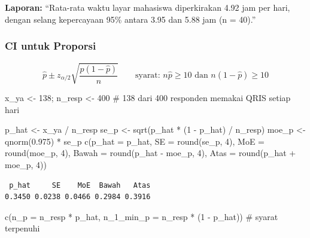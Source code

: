\documentclass[
  indonesian,
  letterpaper,
]{book}
\newenvironment{Shaded}{\begin{snugshade}}{\end{snugshade}}
\newcommand{\AttributeTok}[1]{\textcolor[rgb]{0.40,0.45,0.13}{#1}}
\newcommand{\CommentTok}[1]{\textcolor[rgb]{0.37,0.37,0.37}{#1}}
\newcommand{\DecValTok}[1]{\textcolor[rgb]{0.68,0.00,0.00}{#1}}
\newcommand{\FloatTok}[1]{\textcolor[rgb]{0.68,0.00,0.00}{#1}}
\newcommand{\FunctionTok}[1]{\textcolor[rgb]{0.28,0.35,0.67}{#1}}
\newcommand{\NormalTok}[1]{\textcolor[rgb]{0.00,0.23,0.31}{#1}}
\newcommand{\OtherTok}[1]{\textcolor[rgb]{0.00,0.23,0.31}{#1}}
\newcommand{\SpecialCharTok}[1]{\textcolor[rgb]{0.37,0.37,0.37}{#1}}
\begin{document}
\textbf{Laporan:} ``Rata-rata waktu layar mahasiswa diperkirakan 4.92
jam per hari, dengan selang kepercayaan 95\% antara 3.95 dan 5.88 jam (n
= 40).''

\subsubsection{CI untuk Proporsi}\label{ci-untuk-proporsi}

\[\hat{p} \pm z_{\alpha/2}\sqrt{\frac{\hat{p}(1 - \hat{p})}{n}} \qquad \text{syarat: } n\hat{p} \geq 10 \text{ dan } n(1 - \hat{p}) \geq 10\]

\begin{Shaded}
\begin{Highlighting}[]
\NormalTok{x\_ya }\OtherTok{\textless{}{-}} \DecValTok{138}\NormalTok{; n\_resp }\OtherTok{\textless{}{-}} \DecValTok{400} \CommentTok{\# 138 dari 400 responden memakai QRIS setiap hari}

\NormalTok{p\_hat }\OtherTok{\textless{}{-}}\NormalTok{ x\_ya }\SpecialCharTok{/}\NormalTok{ n\_resp}
\NormalTok{se\_p }\OtherTok{\textless{}{-}} \FunctionTok{sqrt}\NormalTok{(p\_hat }\SpecialCharTok{*}\NormalTok{ (}\DecValTok{1} \SpecialCharTok{{-}}\NormalTok{ p\_hat) }\SpecialCharTok{/}\NormalTok{ n\_resp)}
\NormalTok{moe\_p }\OtherTok{\textless{}{-}} \FunctionTok{qnorm}\NormalTok{(}\FloatTok{0.975}\NormalTok{) }\SpecialCharTok{*}\NormalTok{ se\_p}
\FunctionTok{c}\NormalTok{(}\AttributeTok{p\_hat =}\NormalTok{ p\_hat, }\AttributeTok{SE =} \FunctionTok{round}\NormalTok{(se\_p, }\DecValTok{4}\NormalTok{), }\AttributeTok{MoE =} \FunctionTok{round}\NormalTok{(moe\_p, }\DecValTok{4}\NormalTok{),}
  \AttributeTok{Bawah =} \FunctionTok{round}\NormalTok{(p\_hat }\SpecialCharTok{{-}}\NormalTok{ moe\_p, }\DecValTok{4}\NormalTok{), }\AttributeTok{Atas =} \FunctionTok{round}\NormalTok{(p\_hat }\SpecialCharTok{+}\NormalTok{ moe\_p, }\DecValTok{4}\NormalTok{))}
\end{Highlighting}
\end{Shaded}

\begin{verbatim}
 p_hat     SE    MoE  Bawah   Atas 
0.3450 0.0238 0.0466 0.2984 0.3916 
\end{verbatim}

\begin{Shaded}
\begin{Highlighting}[]
\FunctionTok{c}\NormalTok{(}\AttributeTok{n\_p =}\NormalTok{ n\_resp }\SpecialCharTok{*}\NormalTok{ p\_hat, }\AttributeTok{n\_1\_min\_p =}\NormalTok{ n\_resp }\SpecialCharTok{*}\NormalTok{ (}\DecValTok{1} \SpecialCharTok{{-}}\NormalTok{ p\_hat)) }\CommentTok{\# syarat terpenuhi}
\end{Highlighting}
\end{Shaded}
\end{document}
